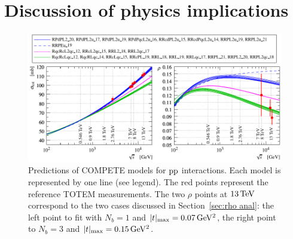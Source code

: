 \section{Discussion of physics implications}
\label{sec:discussion}

\begin{figure}
\vskip-5mm
\begin{center}
\includegraphics{fig/compete_bands_si_tot_rho.pdf}
\caption{%
Predictions of COMPETE models \cite{compete-details} for $\rm pp$ interactions. Each model is represented by one line (see legend). The red points represent the reference TOTEM measurements. The two $\rho$ points at $13\,{\rm TeV}$ correspond to the two cases discussed in Section~\ref{sec:rho anal}: the left point to fit with $N_b=1$ and $|t|_{\rm max} = 0.07\,{\rm GeV^2}$, the right point to $N_b=3$ and $|t|_{\rm max} = 0.15\,{\rm GeV^2}$.
}
\label{fig:comp bands}
\end{center}
\end{figure}

